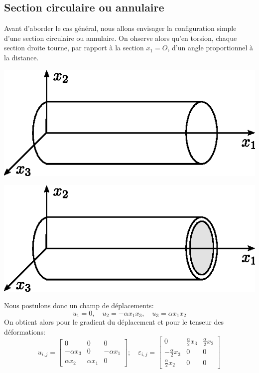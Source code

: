 \subsection{Section circulaire ou annulaire} \label{ssec:Ch07-2.1}
Avant d'aborder le cas général, nous allons envisager la configuration simple d'une section circulaire ou annulaire.
On ohserve alors qu'en torsion, chaque section droite tourne, par rapport à la section $x_1=O$, d'un angle proportionnel à la distance.
\begin{multicols}{2}
    \begin{center}
        \includegraphics{../images/T1_Ch07-09}
    \end{center}
    \begin{center}
        \includegraphics{../images/T1_Ch07-10}
    \end{center}
\end{multicols}
Nous postulons donc un champ de déplacements:
\begin{equation}
    u_1 = 0,\quad u_2 = -\alpha x_1 x_3,\quad u_3 = \alpha x_1 x_2
    \label{eq:Ch07-037}
\end{equation}
On obtient alors pour le gradient du déplacement et pour le tenseur des déformations:
\begin{equation}
    u_{i,j} = 
    \begin{bmatrix}
        0 & 0 & 0 \\
        -\alpha x_3 & 0 & -\alpha x_1 \\
        \alpha x_2 & \alpha x_1 & 0
    \end{bmatrix};\quad
    \varepsilon_{i,j} = 
    \begin{bmatrix}
        0 & \frac{\alpha}{2}x_3 & \frac{\alpha}{2}x_2 \\
        -\frac{\alpha}{2}x_3 & 0 & 0 \\
        \frac{\alpha}{2}x_2 & 0 & 0
    \end{bmatrix}
    \label{eq:Ch07-038}
\end{equation}

